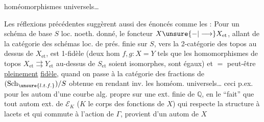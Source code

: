 homéomorphismes universels\ldots

Les réflexions précédentes suggèrent aussi des énoncés comme les  : Pour un schéma de base $S$ loc. noeth. donné,
le foncteur $X\unsure{-|\longrightarrow}X_{\mathrm{et}}$, allant de la catégorie des schémas loc. de prés. finie  sur $S$, vers la 2-catégorie des topos au dessus de $X_{\mathrm{et}}$, est  1-fidèle (deux hom $f,g:X=Y$ tels que les homomorphismes de topos  $X_{\mathrm{et}}\rightrightarrows Y_{\mathrm{et}}$ au-dessus de $S_{\mathrm{et}}$ soient  isomorphes, sont égaux) et $=$ peut-être \uline{pleinement} \uline{fidèle}, quand on passe à la catégorie des fractions de $(\mathrm{Sch}_{\unsure{l.t.f.}})/S$ obtenue en rendant inv. les homéom. universels\ldots {}  ceci p.ex. pour les autom d'une courbe alg. propre sur une ext. finie de $\mathbb{Q}$, en  le ``fait'' que tout autom ext. de $\mathcal E_K$ ($K$ le corps des fonctions de $X$) qui respecte la structure à lacets et qui commute à l'action de $\Gamma$, provient d'un autom de $X$
